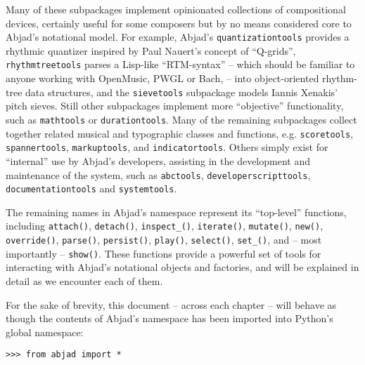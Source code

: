 \noindent Many of these subpackages implement opinionated collections of
compositional devices, certainly useful for some composers but by no means
considered core to Abjad's notational model. For example, Abjad's
\texttt{quantizationtools} provides a rhythmic quantizer inspired by Paul
Nauert's concept of \enquote{Q-grids}\cite{nauert1997timespan},
\texttt{rhythmtreetools} parses a Lisp-like \enquote{RTM-syntax} -- which
should be familiar to anyone working with OpenMusic\cite{assayag1999sw},
PWGL\cite{laurson2009qf, kuuskankare2004recent} or Bach\cite{agostini2013real},
-- into object-oriented rhythm-tree data structures, and the
\texttt{sievetools} subpackage models Iannis Xenakis' pitch
sieves\cite{xenakis1992formalized}. Still other subpackages implement more
\enquote{objective} functionality, such as \texttt{mathtools} or
\texttt{durationtools}. Many of the remaining subpackages collect together
related musical and typographic classes and functions, e.g.
\texttt{scoretools}, \texttt{spannertools}, \texttt{markuptools}, and
\texttt{indicatortools}. Others simply exist for \enquote{internal} use by
Abjad's developers, assisting in the development and maintenance of the system,
such as \texttt{abctools}, \texttt{developerscripttools},
\texttt{documentationtools} and \texttt{systemtools}.

The remaining names in Abjad's namespace represent its \enquote{top-level}
functions, including \texttt{attach()}, \texttt{detach()},
\texttt{inspect\_()}, \texttt{iterate()}, \texttt{mutate()}, \texttt{new()},
\texttt{override()}, \texttt{parse()}, \texttt{persist()}, \texttt{play()},
\texttt{select()}, \texttt{set\_()}, and -- most importantly --
\texttt{show()}. These functions provide a powerful set of tools for
interacting with Abjad's notational objects and factories, and will be
explained in detail as we encounter each of them.

For the sake of brevity, this document -- across each chapter -- will behave as
though the contents of Abjad's namespace has been imported into Python's global
namespace:

\begin{comment}
<abjad>
from abjad import *
</abjad>
\end{comment}

\begin{abjadbookoutput}
\begin{singlespacing}
\vspace{-0.5\baselineskip}
\begin{lstlisting}
>>> from abjad import *
\end{lstlisting}
\end{singlespacing}
\end{abjadbookoutput}

